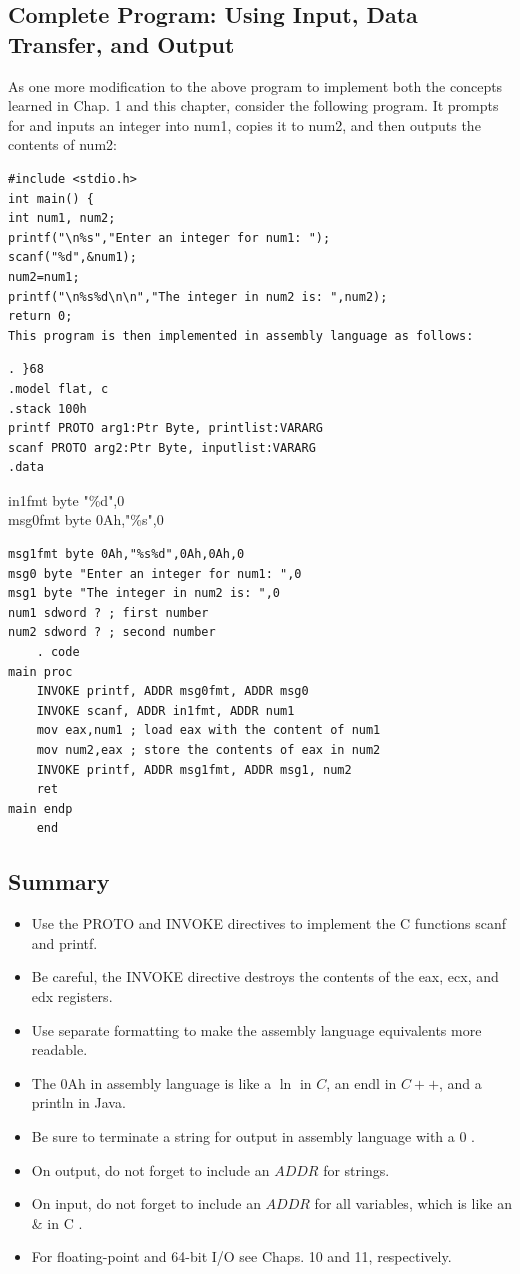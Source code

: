 \documentclass[10pt]{book}
\begin{document}
\subsection{Complete Program: Using Input, Data Transfer, and Output}
As one more modification to the above program to implement both the concepts learned in Chap. 1 and this chapter, consider the following program. It prompts for and inputs an integer into num1, copies it to num2, and then outputs the contents of num2:

\begin{verbatim}
#include <stdio.h>
int main() {
int num1, num2;
printf("\n%s","Enter an integer for num1: ");
scanf("%d",&num1);
num2=num1;
printf("\n%s%d\n\n","The integer in num2 is: ",num2);
return 0;
This program is then implemented in assembly language as follows:
\end{verbatim}

\begin{verbatim}
. }68
.model flat, c
.stack 100h
printf PROTO arg1:Ptr Byte, printlist:VARARG
scanf PROTO arg2:Ptr Byte, inputlist:VARARG
.data
\end{verbatim}

in1fmt byte "\%d",0\\
msg0fmt byte 0Ah,"\%s",0

\begin{verbatim}
msg1fmt byte 0Ah,"%s%d",0Ah,0Ah,0
msg0 byte "Enter an integer for num1: ",0
msg1 byte "The integer in num2 is: ",0
num1 sdword ? ; first number
num2 sdword ? ; second number
    . code
main proc
    INVOKE printf, ADDR msg0fmt, ADDR msg0
    INVOKE scanf, ADDR in1fmt, ADDR num1
    mov eax,num1 ; load eax with the content of num1
    mov num2,eax ; store the contents of eax in num2
    INVOKE printf, ADDR msg1fmt, ADDR msg1, num2
    ret
main endp
    end
\end{verbatim}

\subsection{Summary}
\begin{itemize}
  \item Use the PROTO and INVOKE directives to implement the C functions scanf and printf.
  \item Be careful, the INVOKE directive destroys the contents of the eax, ecx, and edx registers.
  \item Use separate formatting to make the assembly language equivalents more readable.
  \item The 0Ah in assembly language is like a $\ln$ in $C$, an endl in $C++$, and a println in Java.
  \item Be sure to terminate a string for output in assembly language with a 0 .
  \item On output, do not forget to include an $A D D R$ for strings.
  \item On input, do not forget to include an $A D D R$ for all variables, which is like an \& in C .
  \item For floating-point and 64-bit I/O see Chaps. 10 and 11, respectively.
\end{itemize}
\end{document}

